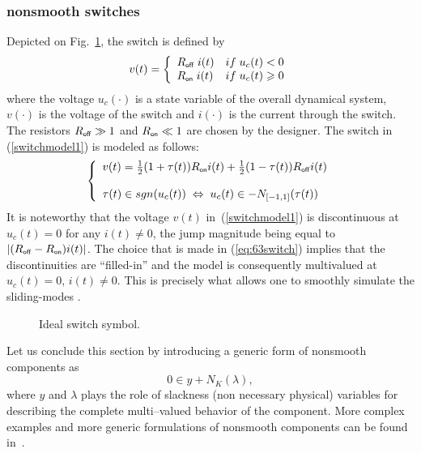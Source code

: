 \subsubsection{nonsmooth switches} Depicted on Fig.~\ref{fig:IDEAL_SWITCH}, the switch is defined by 
\begin{equation}\label{switchmodel1}
v(t)=\left\{\begin{array}{ll} R_\off\; i(t) & \mbox{if}\;u_{c}(t) < 0 \\   R_\on\; i(t) & \mbox{if}\;u_{c}(t) \geq  0  \end{array}\right.
\end{equation} 
where the voltage $u_{c}(\cdot)$ is a state variable of the overall dynamical system, $v(\cdot)$ is the voltage of the switch and $i(\cdot)$ is the current through the switch. The resistors $R_\off \gg 1$ and $R_\on \ll 1$ are chosen by the designer. The switch in (\ref{switchmodel1}) is modeled as follows:
\begin{equation}
  \label{eq:63switch}
\left\{\begin{array}{l}
v(t)=\frac{1}{2}(1+\tau(t))R_\on i(t)+\frac{1}{2}(1-\tau(t))R_\off i(t)  \\ \\ \tau(t) \in \mbox{sgn}(u_{c}(t)) \; \Leftrightarrow \; u_{c}(t) \in -N_{[-1,1]}(\tau(t))
\end{array}\right.
\end{equation}
 It is noteworthy that the voltage $v(t)$ in~(\ref{switchmodel1}) is discontinuous at $u_{c}(t)=0$ for any $i(t) \not = 0$, the jump magnitude being equal to $|(R_\off-R_\on)i(t)|$. The choice that is made in (\ref{eq:63switch}) implies that the discontinuities are ``filled-in'' and the model is consequently multivalued at $u_{c}(t)=0$,  $i(t) \not = 0$. This is precisely what allows one to smoothly simulate the sliding-modes \cite{Acary.Brogliato2009}. 
\begin{figure}
  \centering
  \scalebox{0.7}{
  
  }
  \caption{Ideal switch symbol.}
  \label{fig:IDEAL_SWITCH}
\end{figure}
Let us conclude this section by introducing a generic form of nonsmooth components as
\begin{equation}
  \label{eq:nonsmooth}
   0 \in y + N_K(\lambda),
\end{equation}
where $y$ and $\lambda$ plays the role of slackness (non necessary physical) variables for describing the complete multi--valued behavior of the component. More complex examples and more generic formulations of nonsmooth components can be found in~\cite{Acary.ea_RR2009}.
